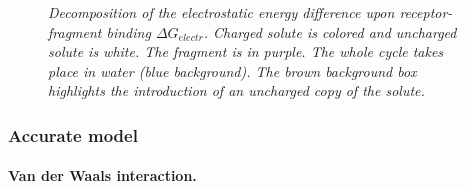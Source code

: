\documentclass[a4paper,12pt,titlepage]{article}
\begin{document}
\begin{figure}
\caption{\textit{Decomposition of the electrostatic energy difference upon receptor-fragment binding $\Delta G_{electr}$. Charged solute is colored and uncharged solute is white. The fragment is in purple. The whole cycle takes place in water (blue background). The brown background box highlights the introduction of an uncharged copy of the solute.}}
\label{fig:thermo_cycle}
\end{figure}

\subsubsection{Accurate model}
\label{accurate:model}

\paragraph{Van der Waals interaction.}
\end{document}
